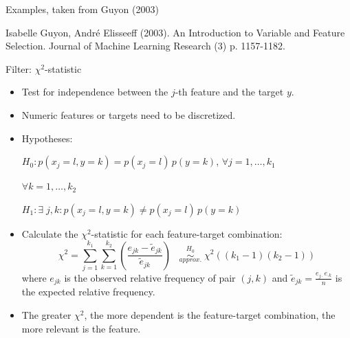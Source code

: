 \begin{vbframe}{Examples, taken from Guyon (2003)}
\begin{center}
\footnotesize{Isabelle Guyon, André Elisseeff (2003). An Introduction to Variable and Feature Selection.  Journal of Machine Learning Research (3) p. 1157-1182.}
\end{center}

\end{vbframe}



\begin{vbframe}{Filter: $\chi^2$-statistic}
\begin{itemize}
  \item Test for independence between the $j$-th feature and the target $y$.
  \item Numeric features or targets need to be discretized.
  \item Hypotheses:

  $H_0: p(x_j = l, y = k) = p(x_j = l)\, p(y = k)$, $\forall j = 1, \dots, k_1$

  \noindent\hspace*{6.55cm} $\forall k = 1, \dots, k_2$

  $H_1: \exists \; j, k: p(x_j = l, y = k) \neq p(x_j = l)\, p(y = k)$
  \item Calculate the $\chi^2$-statistic for each feature-target combination:
    $$ \chi^2 = \sum_{j = 1}^{k_1} \sum_{k=1}^{k_2} (\frac{e_{jk} - \tilde{e}_{jk}}{\tilde{e}_{jk}}) \;\;\;   \stackrel{H_0}{\underset{approx.}{\sim}} \; \chi^2 ((k_1-1)(k_2-1))$$
  where $e_{jk}$ is the observed relative frequency of pair $(j,k)$ and $\tilde{e}_{jk} = \frac{e_{j \cdot} e_{\cdot k}}{n}$ is the expected relative frequency.
  \item The greater $\chi^2$, the more dependent is the feature-target combination, the more relevant is the feature.
\end{itemize}
\end{vbframe}


